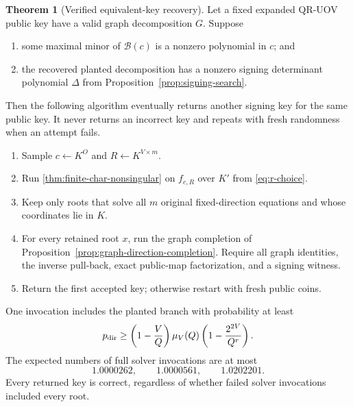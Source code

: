\documentclass[11pt,a4paper]{article}
\theoremstyle{definition}
\newtheorem{theorem}{Theorem}[section]
\theoremstyle{remark}
\newcommand{\QRUOV}{\textsf{QR-UOV}}
\begin{document}
\begin{theorem}[Verified equivalent-key recovery]\label{thm:verified-directional-recovery}
Let a fixed expanded \QRUOV{} public key have a valid graph decomposition $G$.  Suppose
\begin{enumerate}
\item some maximal minor of $\mathcal B(c)$ is a nonzero polynomial in $c$; and
\item the recovered planted decomposition has a nonzero signing determinant polynomial $\Delta$ from Proposition~\ref{prop:signing-search}.
\end{enumerate}
Then the following algorithm eventually returns another signing key for the
same public key.  It never returns an incorrect key and repeats with fresh
randomness when an attempt fails.

\begin{enumerate}
\item Sample $c\leftarrow K^O$ and $R\leftarrow K^{V\times m}$.
\item Run \cref{thm:finite-char-nonsingular} on $f_{c,R}$ over $K'$ from \eqref{eq:r-choice}.
\item Keep only roots that solve all $m$ original fixed-direction equations and
whose coordinates lie in $K$.
\item For every retained root $x$, run the graph completion of
Proposition~\ref{prop:graph-direction-completion}.  Require all graph
identities, the inverse pull-back, exact public-map factorization, and a
signing witness.
\item Return the first accepted key; otherwise restart with fresh public coins.
\end{enumerate}

One invocation includes the planted branch with probability at least
\begin{equation}\label{eq:directional-invocation-success}
 p_{\rm dir}
 \ge
 \left(1-\frac VQ\right)
 \mu_V(Q)
 \left(1-\frac{2^{2V}}{Q^r}\right).
\end{equation}
The expected numbers of full solver invocations are at most
\begin{equation}\label{eq:directional-restart-values}
 1.0000262,
 \qquad1.0000561,
 \qquad1.0202201.
\end{equation}
Every returned key is correct, regardless of whether failed solver invocations
included every root.
\end{theorem}
\end{document}
